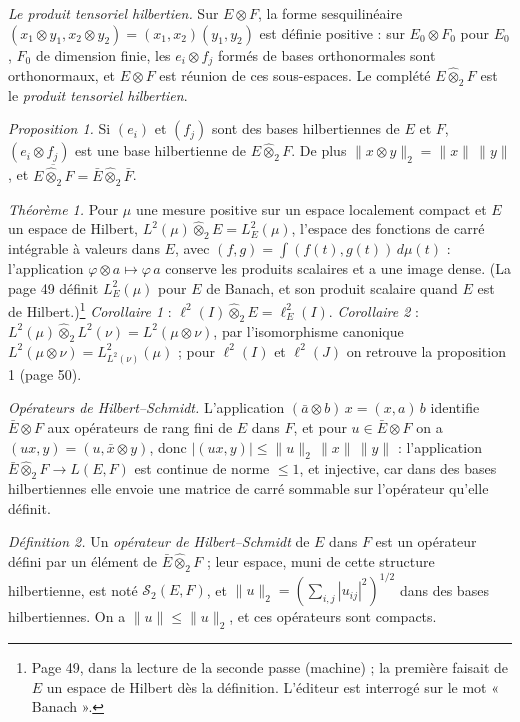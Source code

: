 \documentclass[11pt,a4paper]{article}
\begin{document}
\emph{Le produit tensoriel hilbertien.} Sur $E \otimes F$, la forme
sesquilinéaire $(x_1 \otimes y_1, x_2 \otimes y_2) = (x_1, x_2)(y_1, y_2)$ est
définie positive : sur $E_0 \otimes F_0$ pour $E_0$, $F_0$ de dimension finie,
les $e_i \otimes f_j$ formés de bases orthonormales sont orthonormaux, et
$E \otimes F$ est réunion de ces sous-espaces. Le complété $E
\mathbin{\hat\otimes}_2 F$ est le \emph{produit tensoriel hilbertien}.

\emph{Proposition 1.} Si $(e_i)$ et $(f_j)$ sont des bases hilbertiennes de
$E$ et $F$, $(e_i \otimes f_j)$ est une base hilbertienne de $E
\mathbin{\hat\otimes}_2 F$. De plus $\|x \otimes y\|_2 = \|x\|\,\|y\|$, et
$\overline{E \mathbin{\hat\otimes}_2 F} = \bar{E} \mathbin{\hat\otimes}_2 \bar{F}$.

\emph{Théorème 1.} Pour $\mu$ une mesure positive sur un espace localement
compact et $E$ un espace de Hilbert, $L^2(\mu) \mathbin{\hat\otimes}_2 E =
L^2_E(\mu)$, l'espace des fonctions de carré intégrable à valeurs dans $E$,
avec $(f, g) = \int (f(t), g(t))\,d\mu(t)$ : l'application $\varphi \otimes a
\mapsto \varphi\,a$ conserve les produits scalaires et a une image dense.
(La page 49 définit $L^2_E(\mu)$ pour $E$ de Banach, et son produit scalaire
quand $E$ est de Hilbert.)\footnote{Page 49, dans la lecture de la seconde
passe (machine) ; la première faisait de $E$ un espace de Hilbert dès la
définition. L'éditeur est interrogé sur le mot « Banach ».}
\emph{Corollaire 1} : $\ell^2(I) \mathbin{\hat\otimes}_2 E = \ell^2_E(I)$.
\emph{Corollaire 2} : $L^2(\mu) \mathbin{\hat\otimes}_2 L^2(\nu) = L^2(\mu
\otimes \nu)$, par l'isomorphisme canonique $L^2(\mu \otimes \nu) =
L^2_{L^2(\nu)}(\mu)$ ; pour $\ell^2(I)$ et $\ell^2(J)$ on retrouve la
proposition 1 (page 50).

\emph{Opérateurs de Hilbert--Schmidt.} L'application $(\bar{a} \otimes b)\,x =
(x, a)\,b$ identifie $\bar{E} \otimes F$ aux opérateurs de rang fini de $E$
dans $F$, et pour $u \in \bar{E} \otimes F$ on a $(ux, y) = (u, \bar{x}
\otimes y)$, donc $|(ux, y)| \leq \|u\|_2\,\|x\|\,\|y\|$ : l'application
$\bar{E} \mathbin{\hat\otimes}_2 F \to L(E,F)$ est continue de norme $\leq 1$,
et injective, car dans des bases hilbertiennes elle envoie une matrice de
carré sommable sur l'opérateur qu'elle définit.

\emph{Définition 2.} Un \emph{opérateur de Hilbert--Schmidt} de $E$ dans $F$
est un opérateur défini par un élément de $\bar{E} \mathbin{\hat\otimes}_2 F$ ;
leur espace, muni de cette structure hilbertienne, est noté
$\mathcal{S}_2(E,F)$, et $\|u\|_2 = (\sum_{i,j} |u_{ij}|^2)^{1/2}$ dans des
bases hilbertiennes. On a $\|u\| \leq \|u\|_2$, et ces opérateurs sont
compacts.
\end{document}
